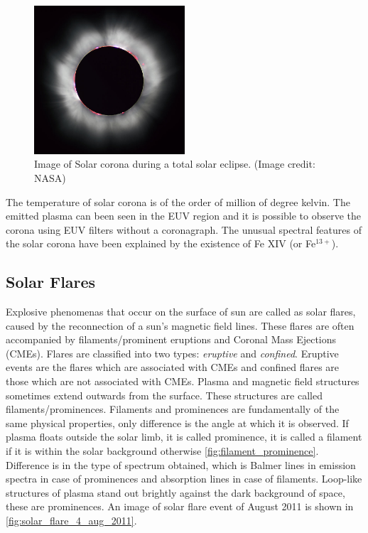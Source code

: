 \begin{figure}[h!]
    \centering
    \includegraphics[width=0.5\textwidth]{images/corona.jpg}
    \caption[Image of Solar corona during a total solar eclipse]{Image of Solar corona during a total solar eclipse. (Image credit: NASA)}
    \label{fig:corona_eclipse}
\end{figure}

The temperature of solar corona is of the order of million of degree kelvin. The emitted plasma can been seen in the EUV region and it is possible to observe the corona using EUV filters without a coronagraph. The unusual spectral features of the solar corona have been explained by the existence of Fe XIV (or Fe$^{13+}$). \citep{aschwanden2006physics}

\subsection{Solar Flares}

Explosive phenomenas that occur on the surface of sun are called as solar flares, caused by the reconnection of a sun's magnetic field lines. These flares are often accompanied by filaments/prominent eruptions and Coronal Mass Ejections (CMEs). Flares are classified into two types: \textit{eruptive} and \textit{confined}. Eruptive events are the flares which are associated with CMEs and confined flares are those which are not associated with CMEs. Plasma and magnetic field structures sometimes extend outwards from the surface. These structures are called filaments/prominences. Filaments and prominences are fundamentally of the same physical properties, only difference is the angle at which it is observed. If plasma floats outside the solar limb, it is called prominence, it is called a filament if it is within the solar background otherwise \cref{fig:filament_prominence}. Difference is in the type of spectrum obtained, which is Balmer lines in emission spectra in case of prominences and absorption lines in case of filaments. Loop-like structures of plasma stand out brightly against the dark background of space, these are prominences. An image of solar flare event of  August 2011 is shown in \cref{fig:solar_flare_4_aug_2011}.

